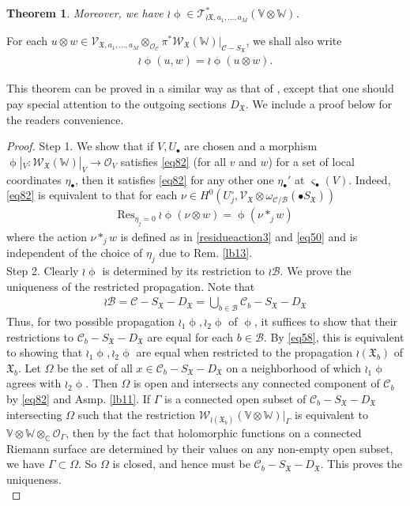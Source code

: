 \documentclass[11pt,b5paper,notitlepage]{article}
\theoremstyle{definition}
\theoremstyle{plain}
\newtheorem{thm}[df]{Theorem}
\newcommand{\fk}{\mathfrak}
\newcommand{\mc}{\mathcal}
\newcommand{\Res}{\mathrm{Res}}
\newcommand{\scr}{\mathscr}
\newcommand{\sgm}{\varsigma}
\newcommand{\SX}{{S_{\fk X}}}
\newcommand{\DX}{D_{\fk X}}
\newcommand{\blt}{\bullet}
\newcommand{\Vbb}{\mathbb V}
\newcommand{\Wbb}{\mathbb W}
\newcommand{\Cbb}{\mathbb C}
\newcommand{\<}{\left\langle}
\renewcommand{\>}{\right\rangle}
\numberwithin{equation}{section}
\begin{document}
\begin{thm}
Moreover, we have $\wr\upphi\in\scr T_{\wr{\fk X},a_1,\dots,a_M}^*(\Vbb\otimes\Wbb)$.
\end{thm}

For each $u\otimes w\in \scr V_{\fk X,a_1,\dots,a_M}\otimes_{\mc O_{\mc C}}\pi^*\scr W_{\fk X}(\Wbb)\big|_{\mc C-\SX}$, we shall also write
\begin{align}
\wr\upphi(u,w)=\wr\upphi(u\otimes w).  \label{eq64}
\end{align}

This theorem can be proved in a similar way as that of \cite[Thm. 7.1]{Gui-propagation}, except that one should pay special attention to the outgoing sections $\DX$.  We include a proof below for the readers convenience.  %

\begin{proof}
Step 1. We show that if $V,U_\blt$ are chosen and a morphism $\upphi|_V:\scr W_{\fk X}(\Wbb)|_V\rightarrow \mc O_V$ satisfies \eqref{eq82} (for all $v$ and $w$) for a set of local coordinates $\eta_\blt$, then it satisfies \eqref{eq82} for any other one $\eta_\blt'$ at $\sgm_\blt(V)$. Indeed,  \eqref{eq82} is equivalent to that for each $\nu\in H^0(U_j^\circ,\scr  V_{\fk X}\otimes\omega_{\mc C/\mc B}(\blt\SX))$
\begin{align}
\Res_{\eta_j=0}~\wr\upphi(\nu\otimes w)=\upphi(\nu*_j w)
\end{align}
where the action $\nu*_j w$ is defined as in \eqref{residueaction3} and \eqref{eq50} and is independent of the choice of $\eta_j$ due to Rem. \ref{lb13}.\\

Step 2.  Clearly $\wr\upphi$ is determined by its restriction to $\wr\mc B$. We prove the uniqueness of the restricted propagation.  Note that
\begin{align}
\wr\mc B=\mc C-\SX-\DX=\bigcup_{b\in\mc B}\mc C_b-\SX-\DX\label{eq59}
\end{align}
Thus, for two possible propagation $\wr_1\upphi,\wr_2\upphi$ of $\upphi$,  it suffices to show that their restrictions to $\mc C_b-\SX-\DX$ are equal for each $b\in\mc B$. By \eqref{eq58}, this is equivalent to showing that $\wr_1\upphi,\wr_2\upphi$ are equal when restricted to the propagation $\wr(\fk X_b)$ of $\fk X_b$. Let $\Omega$ be the set of all $x\in\mc C_b-\SX-\DX$ on a neighborhood of which $\wr_1\upphi$ agrees with $\wr_2\upphi$. Then $\Omega$ is open and intersects any connected component of $\mc C_b$ by \eqref{eq82} and Asmp. \ref{lb11}. If $\Gamma$ is a connected open subset of $\mc C_b-\SX-\DX$ intersecting $\Omega$ such that the restriction $\scr W_{\wr(\fk X_b)}(\Vbb\otimes\Wbb)|_\Gamma$ is equivalent to $\Vbb\otimes\Wbb\otimes_\Cbb\mc O_\Gamma$, then by the fact that holomorphic functions on a connected Riemann surface are determined by their values on any non-empty open subset, we have $\Gamma\subset\Omega$. So $\Omega$ is closed, and hence must be $\mc C_b-\SX-\DX$. This proves the uniqueness.\\


\end{proof}
\end{document}
